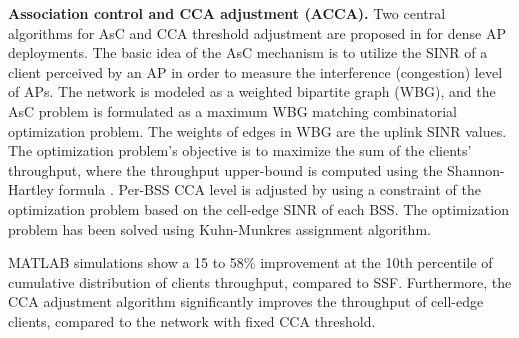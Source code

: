 
\textbf{Association control and CCA adjustment (ACCA).} 
Two central algorithms for AsC and CCA threshold adjustment are proposed in \cite{Association-CCA-2015} for dense AP deployments.
The basic idea of the AsC mechanism is to utilize the SINR of a client perceived by an AP in order to measure the interference (congestion) level of APs. 
The network is modeled as a weighted bipartite graph (WBG), and the AsC problem is formulated as a maximum WBG matching combinatorial optimization problem. 
The weights of edges in WBG are the uplink SINR values. 
The optimization problem's objective is to maximize the sum of the clients' throughput, where the throughput upper-bound is computed using the Shannon-Hartley formula \cite{rappaport1996wireless}.
Per-BSS CCA level is adjusted by using a constraint of the optimization problem based on the cell-edge SINR of each BSS. 
The optimization problem has been solved using Kuhn-Munkres \cite{Kuhn} assignment algorithm.

MATLAB simulations show a 15 to 58\% improvement at the 10th percentile of cumulative distribution of clients throughput, compared to SSF.
Furthermore, the CCA adjustment algorithm significantly improves the throughput of cell-edge clients, compared to the network with fixed CCA threshold.




